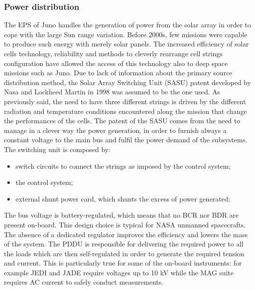 \subsubsection{Power distribution}
\label{subsec: pwr_distribution}

The EPS of Juno handles the generation of power from the solar array  in order to cope with the large Sun range variation. Before 2000s, few missions were capable to produce such energy with merely solar panels. The increased efficiency of solar cells technology, reliability and methods to cleverly rearrange cell strings configuration have allowed the access of this technology also to deep space missions such as Juno. 
Due to lack of information about the primary source distribution method, the Solar Array Switching Unit (SASU) patent developed by Nasa and Lockheed Martin in 1998 was assumed to be the one used. \cite{sasu}
As previously said, the need to have three different strings is driven by the different radiation and temperature conditions encountered along the mission that change the performances of the cells. The patent of the SASU comes from the need to manage in a clever way the power generation, in order to furnish always a constant voltage to the main bus and fulfil the power demand of the subsystems. The switching unit is composed by:
\begin{itemize}
    \item switch circuits to connect the strings as imposed by the control system;
    \item the control system;
    \item external shunt power card, which shunts the excess of power generated;
\end{itemize}

The bus voltage is battery-regulated, which means that no BCR nor BDR are present on-board. \cite{bat_regulator}
This design choice is typical for NASA unmanned spacecrafts. \cite{systems_book}
The absence of a dedicated regulator improves the efficiency and lowers the mass of the system.
The PDDU is responsible for delivering the required power to all the loads which are then self-regulated in order to generate the required tension and current. This is particularly true for some of the on-board instruments: for example JEDI\cite{JEDI_info} and JADE\cite{JADE_info} require voltages up to 10 kV while the MAG\cite{MAG_info} suite requires AC current to safely conduct measurements.